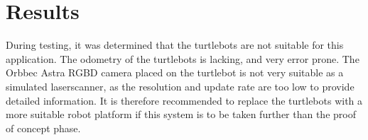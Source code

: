 \documentclass[10pt, journal]{IEEEtran}
\begin{document}
\section{Results}
During testing, it was determined that the turtlebots are not suitable for this application. The odometry of the turtlebots is lacking, and very error prone. The Orbbec Astra RGBD camera placed on the turtlebot is not very suitable as a simulated laserscanner, as the resolution and update rate are too low to provide detailed information. It is therefore recommended to replace the turtlebots with a more suitable robot platform if this system is to be taken further than the proof of concept phase.



\end{document}
